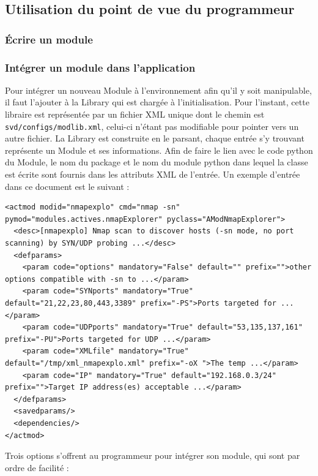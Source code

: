 \documentclass[]{article}
\begin{document}
\subsection{Utilisation du point de vue du programmeur}

\subsubsection{Écrire un module}
\label{writemod}

\subsubsection{Intégrer un module dans l'application}

Pour intégrer un nouveau Module à l'environnement afin qu'il y soit manipulable, il faut l'ajouter à la Library qui est chargée à l'initialisation. Pour l'instant, cette libraire est représentée par un fichier XML unique dont le chemin est \texttt{svd/configs/modlib.xml}, celui-ci n'étant pas modifiable pour pointer vers un autre fichier. La Library est construite en le parsant, chaque entrée s'y trouvant représente un Module et ses informations. Afin de faire le lien avec le code python du Module, le nom du package et le nom du module python dans lequel la classe est écrite sont fournis dans les attributs XML de l'entrée. Un exemple d'entrée dans ce document est le suivant :
\small{
\lstset{language=XML}
\begin{lstlisting}
<actmod modid="nmapexplo" cmd="nmap -sn" pymod="modules.actives.nmapExplorer" pyclass="AModNmapExplorer">
  <desc>[nmapexplo] Nmap scan to discover hosts (-sn mode, no port scanning) by SYN/UDP probing ...</desc>
  <defparams>
    <param code="options" mandatory="False" default="" prefix="">other options compatible with -sn to ...</param>
    <param code="SYNports" mandatory="True" default="21,22,23,80,443,3389" prefix="-PS">Ports targeted for ...</param>
    <param code="UDPports" mandatory="True" default="53,135,137,161" prefix="-PU">Ports targeted for UDP ...</param>
    <param code="XMLfile" mandatory="True" default="/tmp/xml_nmapexplo.xml" prefix="-oX ">The temp ...</param>
    <param code="IP" mandatory="True" default="192.168.0.3/24" prefix="">Target IP address(es) acceptable ...</param>
  </defparams>
  <savedparams/>
  <dependencies/>
</actmod>
\end{lstlisting}
}

Trois options s'offrent au programmeur pour intégrer son module, qui sont par ordre de facilité :
\end{document}
